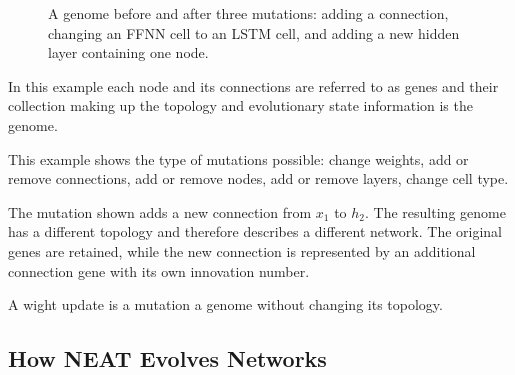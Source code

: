 \documentclass[11pt]{article}
\begin{document}
\begin{figure}[H]

\caption{A genome before and after three mutations: adding a
connection, changing an FFNN cell to an LSTM cell, and adding
a new hidden layer containing one node.}
\label{fig:genome-mutation}

\end{figure}



In this example each node and its connections are referred to as genes and their collection making up the topology and evolutionary state information is the genome.

This example shows the type of mutations possible: change weights, add or remove connections, add or remove nodes, add or remove layers, change cell type.

The mutation shown adds a new connection from \(x_1\) to \(h_2\). The
resulting genome has a different topology and therefore describes a
different network. The original genes are retained, while the new
connection is represented by an additional connection gene with its
own innovation number.

A wight update is a mutation a genome without changing its topology.

\subsection{How NEAT Evolves Networks}
\end{document}
